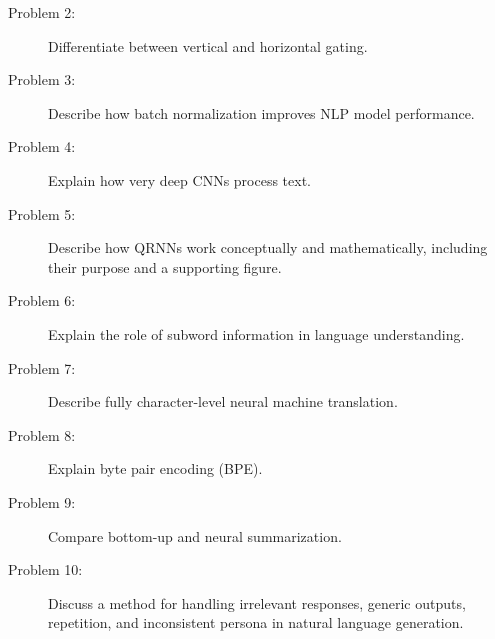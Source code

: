 \documentclass[10pt]{article}
\begin{document}
\begin{description}
\pagebreak

\item[Problem 2:]  Differentiate between vertical and horizontal gating.







\pagebreak

\item[Problem 3:]  Describe how batch normalization improves NLP model performance.

\pagebreak

\item[Problem 4:]  Explain how very deep CNNs process text.

\pagebreak

\item[Problem 5:]  Describe how QRNNs work conceptually and mathematically, including their purpose and a supporting figure.

\pagebreak

\item[Problem 6:]  Explain the role of subword information in language understanding.

\pagebreak

\item[Problem 7:]  Describe fully character-level neural machine translation.

\pagebreak

\item[Problem 8:]  Explain byte pair encoding (BPE).

\pagebreak

\item[Problem 9:]  Compare bottom-up and neural summarization.

\pagebreak


\item[Problem 10:]  Discuss a method for handling irrelevant responses, generic outputs, repetition, and inconsistent persona in natural language generation.


\end{description}
\end{document}
